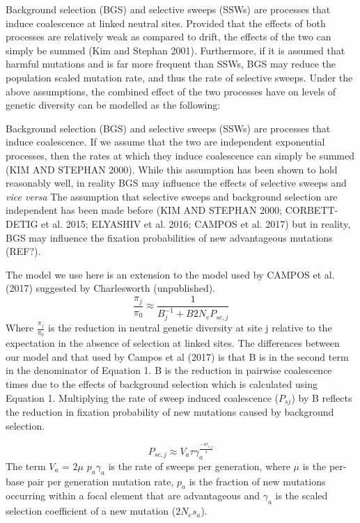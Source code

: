 \documentclass[11pt]{article}
\begin{document}
	Background selection (BGS) and selective sweeps (SSWs) are processes that induce coalescence at linked neutral sites. Provided that the effects of both processes are relatively weak as compared to drift, the effects of the two can simply be summed (Kim and Stephan 2001). Furthermore, if it is assumed that harmful mutations and is far more frequent than SSWs, BGS may reduce the population scaled mutation rate, and thus the rate of selective sweeps. Under the above assumptions, the combined effect of the two processes have on levels of genetic diversity can be modelled as the following:
	

	Background selection (BGS) and selective sweeps (SSWs) are processes that induce coalescence. If we assume that the two are independent exponential processes, then the rates at which they induce coalescence can simply be summed (KIM AND STEPHAN 2000). While this assumption has been shown to hold reasonably well, in reality BGS may influence the effects of selective sweeps and \emph{vice versa}
	The assumption that selective sweeps and background selection are independent has been made before (KIM AND STEPHAN 2000; CORBETT-DETIG et al. 2015; ELYASHIV et al. 2016; CAMPOS et al. 2017) but in reality, BGS may influence the fixation probabilities of new advantageous mutations (REF?). 

The model we use here is an extension to the model used by CAMPOS et al. (2017) suggested by Charlesworth (unpublished). 
\begin{equation}
\label{jointApprox}
\frac{\pi_{j}}{\pi_{0}} \approx  \frac{1}{B_{j}^{-1}  + B2N_eP_{sc,j}}
\end{equation}
	Where \(\frac{\pi_{j}}{\pi_{0}}\) is the reduction in neutral genetic diversity at site j relative to the expectation in the absence of selection at linked sites. The differences between our model and that used by Campos et al (2017) is that B is in the second term in the denominator of Equation 1. B is the reduction in pairwise coalescence times due to the effects of background selection which is calculated using Equation 1. Multiplying the rate of sweep induced coalescence ($P_{sj}$) by B reflects the reduction in fixation probability of new mutations caused by background selection. 

\begin{equation}
\label{singleClass}
P_{sc,j} \approx V_a \tau\gamma_a^{\frac{-4r_{i,j}}{s}} 
\end{equation}
The term $V_{a}$ = $2\mu$ $p_{a}\gamma_{a}$ is the rate of sweeps per generation, where $\mu$ is the per-base pair per generation mutation rate, $p_a$ is the fraction of new mutations occurring within a focal element that are advantageous and $\gamma_a$  is the scaled selection coefficient of a new mutation ($2N_es_a$).
\end{document}
